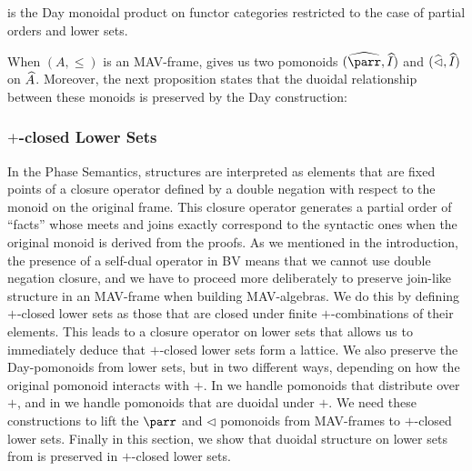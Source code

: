 \begin{rem}
   is the Day monoidal product on functor
  categories \cite{Day_1970} restricted to the case of partial orders
  and lower sets.
\end{rem}

\begin{rem}
  When $(A, \leq)$ is an MAV-frame,  gives us two pomonoids
  $(\Day{\parr}, \Day{I})$ and $(\mathop{\widehat{\lhd}}, \mathop{\widehat{I}})$ on
  $\widehat{A}$. Moreover, the next proposition states that the
  duoidal relationship between these monoids is preserved by the Day
  construction:
\end{rem}


\subsubsection{$+$-closed Lower Sets}
\label{sec:closed-lower-sets}

In the Phase Semantics, structures are interpreted as elements that are
fixed points of a closure operator defined by a double negation with
respect to the monoid on the original frame. This closure operator
generates a partial order of ``facts'' whose meets and joins exactly
correspond to the syntactic ones when the original monoid is derived
from the proofs. As we mentioned in the introduction, the presence of
a self-dual operator in BV means that we cannot use double negation
closure, and we have to proceed more deliberately to preserve
join-like structure in an MAV-frame when building MAV-algebras. We do
this by defining $+$-closed lower sets as those that are closed under
finite $+$-combinations of their elements. This leads to a closure
operator on lower sets that allows us to immediately deduce that
$+$-closed lower sets form a lattice. We also preserve the
Day-pomonoids from lower sets, but in two different ways, depending on
how the original pomonoid interacts with $+$. In  we handle pomonoids that distribute
over $+$, and in  we
handle pomonoids that are duoidal under $+$. We need these
constructions to lift the $\parr$ and $\lhd$ pomonoids from
MAV-frames to $+$-closed lower sets. Finally in this section, we show
that duoidal structure on lower sets from
 is preserved in $+$-closed lower sets.

